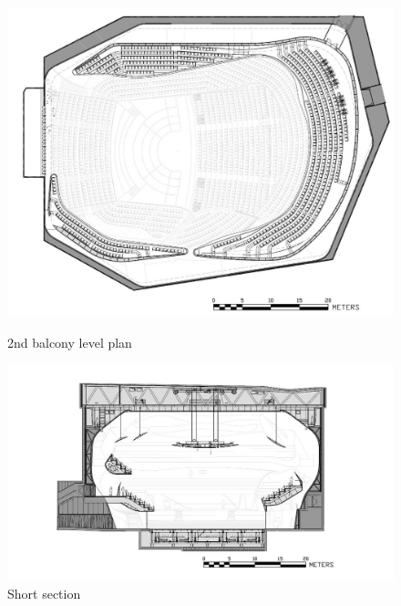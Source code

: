 \begin{figure}[htbp]
 \begin{minipage}{0.5\hsize}
  \begin{center}
   \includegraphics[scale=0.15]{01_att/PLAN_2nd_Balcony_Level.jpg}
  \end{center}
  \caption{\hspace{1mm}2nd balcony level plan}
 \end{minipage}
 \begin{minipage}{0.5\hsize}
  \begin{center}
   \includegraphics[scale=0.15]{01_att/SECTION_Short.jpg}
  \end{center}
  \caption{\hspace{1mm}Short section}
 \end{minipage}
\end{figure}
